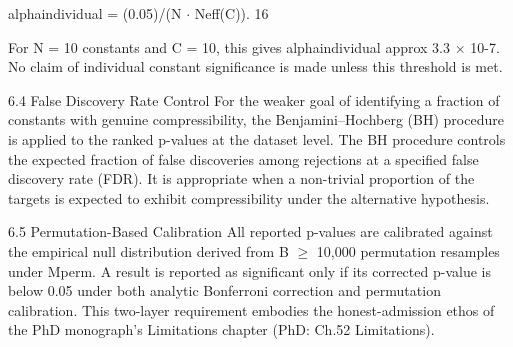   alphaindividual = (0.05)/(N $\cdot$ Neff(C)). 16

  For N = 10 constants and C = 10, this gives alphaindividual approx 3.3 $\times$ 10-7. No
  claim of individual constant significance is made unless this threshold is met.

  6.4 False Discovery Rate Control
  For the weaker goal of identifying a fraction of constants with genuine compressibility,
  the Benjamini--Hochberg (BH) procedure \citep{bh1995} is applied to the ranked p-values at the
  dataset level. The BH procedure controls the expected fraction of false discoveries
  among rejections at a specified false discovery rate (FDR). It is appropriate when a
  non-trivial proportion of the targets is expected to exhibit compressibility under the
  alternative hypothesis.

  6.5 Permutation-Based Calibration
  All reported p-values are calibrated against the empirical null distribution derived from
  B $\geq$ 10{,}000 permutation resamples under Mperm. A result is reported as significant
  only if its corrected p-value is below 0.05 under both analytic Bonferroni correction and
  permutation calibration. This two-layer requirement embodies the honest-admission
  ethos of the PhD monograph's Limitations chapter (PhD: Ch.52 Limitations).

